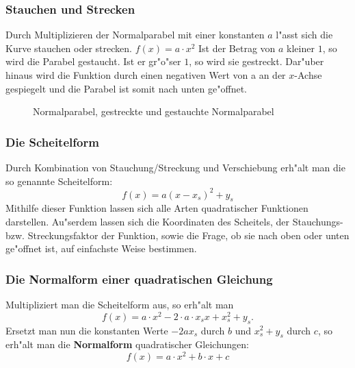 \subsubsection{Stauchen und Strecken}
Durch Multiplizieren der Normalparabel mit einer konstanten $a$ l"asst sich die Kurve stauchen oder strecken. $f(x)=a \cdot x^2$ Ist der Betrag von $a$ kleiner $1$, so wird die Parabel gestaucht. Ist er gr"o"ser $1$, so wird sie gestreckt. Dar"uber hinaus wird die Funktion durch einen negativen Wert von a an der $x$-Achse gespiegelt und die Parabel ist somit nach unten ge"offnet.
\begin{figure}[h!]
\begin{center}
\end{center}
\caption{Normalparabel, gestreckte und gestauchte Normalparabel}
\end{figure}

\subsubsection{Die Scheitelform}
Durch Kombination von Stauchung/Streckung und Verschiebung erh"alt man die so genannte Scheitelform: 
\begin{equation*}
f(x)=a(x-x_s)^2+y_s
\end{equation*}
Mithilfe dieser Funktion lassen sich alle Arten quadratischer Funktionen darstellen. Au"serdem lassen sich die Koordinaten des Scheitels, der Stauchungs- bzw. Streckungsfaktor der Funktion, sowie die Frage, ob sie nach oben oder unten ge"offnet ist, auf einfachste Weise bestimmen.

\subsubsection{Die Normalform einer quadratischen Gleichung}
Multipliziert man die Scheitelform aus, so erh"alt man 
\begin{equation*}
f(x)=a \cdot x^2-2 \cdot a \cdot x_sx+x_s^2+y_s.
\end{equation*}
Ersetzt man nun die konstanten Werte $-2ax_s$ durch $b$ und $x_s^2+y_s$ durch $c$, so erh"alt man die \textbf{Normalform} quadratischer Gleichungen:
\begin{equation*}
f(x)=a \cdot x^2+b \cdot x+c
\end{equation*}

